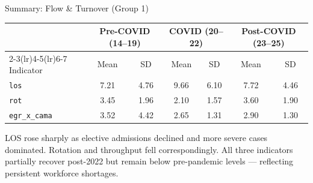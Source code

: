 \documentclass[aspectratio=169]{beamer}
\begin{document}
\begin{frame}{Summary: Flow \& Turnover (Group 1)}
  \begin{center}\scriptsize
    \begin{tabular}{lcccccc}
      \toprule
      & \multicolumn{2}{c}{Pre-COVID (14--19)}
      & \multicolumn{2}{c}{COVID (20--22)}
      & \multicolumn{2}{c}{Post-COVID (23--25)} \\
      \cmidrule(lr){2-3}\cmidrule(lr){4-5}\cmidrule(lr){6-7}
      Indicator & Mean & SD & Mean & SD & Mean & SD \\
      \midrule
      \texttt{los}          & 7.21 & 4.76 & 9.66 & 6.10 & 7.72 & 4.46 \\
      \texttt{rot}          & 3.45 & 1.96 & 2.10 & 1.57 & 3.60 & 1.90 \\
      \texttt{egr\_x\_cama} & 3.52 & 4.42 & 2.65 & 1.31 & 2.90 & 1.30 \\
      \bottomrule
    \end{tabular}
  \end{center}
  \smallskip
  \begin{keybox}
    \scriptsize
     LOS rose sharply as elective admissions declined
    and more severe cases dominated. Rotation and throughput fell correspondingly.
    All three indicators partially recover post-2022 but remain below pre-pandemic
    levels --- reflecting persistent workforce shortages.
  \end{keybox}
\end{frame}

\end{document}

